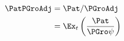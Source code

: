 \begin{equation}\begin{gathered}\begin{aligned}
  \PatPGroAdj  & = \Pat/\PGroAdj
  \\ & = \Ex_{t}\left(\frac{\Pat}{\PGro \psi}\right)
\end{aligned}\end{gathered}\end{equation}
